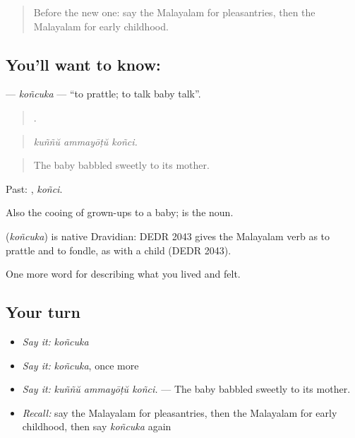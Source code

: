 \label{lesson:ML-C558-koncuka}



\begin{quote}
Before the new one: say the Malayalam for pleasantries, then the Malayalam for early childhood.
\end{quote}

\subsection*{You'll want to know: }
\textbf{} — \emph{koñcuka} — \textquotedblleft{}to prattle; to talk baby talk\textquotedblright{}.

\begin{quote}
  .
\end{quote}

\begin{quote}
\emph{kuññŭ ammayōṭŭ koñci.}
\end{quote}

\begin{quote}
The baby babbled sweetly to its mother.
\end{quote}

Past: , \emph{koñci}.

Also the cooing of grown-ups to a baby;  is the noun.

\begin{cousinweb}
\textbf{} (\emph{koñcuka}) is native Dravidian: DEDR 2043 gives the Malayalam verb as to prattle and to fondle, as with a child (DEDR 2043).
\end{cousinweb}

\begin{grammarlens}[title={What you've built}]
One more word for describing what you lived and felt.
\end{grammarlens}

\subsection*{Your turn}
\begin{itemize}
\raggedright
  \item \emph{Say it:} \emph{koñcuka}
  \item \emph{Say it:} \emph{koñcuka}, once more
  \item \emph{Say it:} \emph{kuññŭ ammayōṭŭ koñci.} — The baby babbled sweetly to its mother.
  \item \emph{Recall:} say the Malayalam for pleasantries, then the Malayalam for early childhood, then say \emph{koñcuka} again
\end{itemize}

